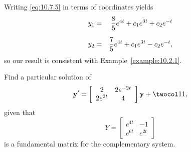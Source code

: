 \begin{examplesolution}
Writing \eqref{eq:10.7.5} in terms of coordinates yields
\begin{eqnarray*}
  y_{1} & = & \frac{8}{5}e^{4t}+c_{1}e^{3t}+c_{2}e^{-t} \\[2\jot]
  y_{2} & = & \frac{7}{5}e^{4t}+c_{1}e^{3t}-c_{2}e^{-t},
\end{eqnarray*}
so our result is consistent with Example~\ref{example:10.2.1}. \bbox
\end{examplesolution}

\setcounter{example}{1}
\setcounter{equation}{5}
\begin{example}
  \label{example:10.7.2} \rm Find a particular solution of
  \begin{equation}
    \label{eq:10.7.6}{\bf y}'=\left[
    \begin{array}{cc}
      2       & 2e^{-2t} \\
      2e^{2t} & 4
    \end{array}\right]{\bf y}+\twocol11,
  \end{equation}
  given that
  \[
    Y=\left[
    \begin{array}{cc}
      e^{4t} & -1     \\
      e^{6t} & e^{2t}
    \end{array}\right]
  \]
  is a fundamental matrix for the complementary system.
\end{example}
